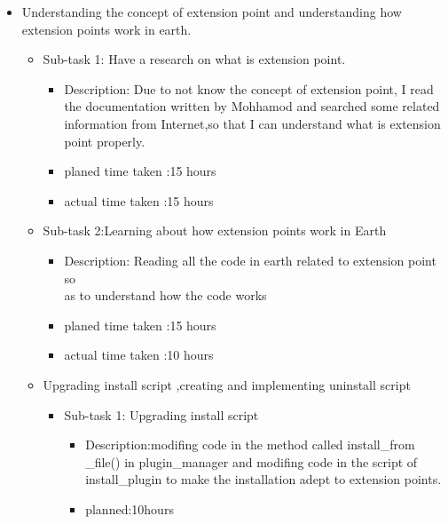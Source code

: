 \documentclass{article}
\begin{document}
\begin{itemize}
    \item Understanding the concept of extension point and understanding how extension points work in earth.
        \begin{itemize}
            \item Sub-task 1: Have a research on what is extension point. 
                \begin{itemize}
                   \item Description: Due to not know the concept of extension point, I read the documentation written by Mohhamod and searched some related information from Internet,so that I can understand what is extension point properly.
                   \item planed time taken :15 hours\\
                   \item actual time taken :15 hours\\
                \end{itemize}
            \item Sub-task 2:Learning about how extension points work in Earth
                \begin{itemize}
                    \item Description: Reading all the code in earth related to extension point so \\  as to understand how the code works 
                    \item planed time taken :15 hours\\
                    \item actual time taken :10 hours\\
                \end{itemize}              
            \item Upgrading install script ,creating and implementing uninstall script
                \begin{itemize}
                    \item Sub-task 1:  Upgrading install script
                        \begin{itemize}
                            \item Description:modifing code in the method called install\_from \_file() in plugin\_manager and modifing code in the script of\\        install\_plugin to make the installation adept to extension points.\\
                            \item planned:10hours\\

\end{itemize}
\end{itemize}
\end{itemize}
\end{itemize}
\end{document}
